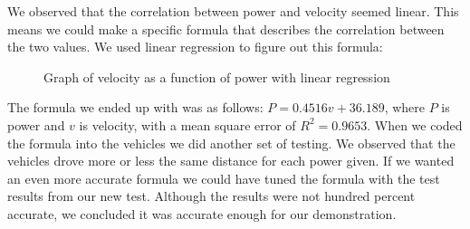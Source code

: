 We observed that the correlation between power and velocity seemed linear. This means we could make a specific formula that describes the correlation between the two values. We used linear regression to figure out this formula:

\begin{figure}[h!]
	\caption{Graph of velocity as a function of power with linear regression}
\end{figure}

The formula we ended up with was as follows: $P = 0.4516v + 36.189$, where $P$ is power and $v$ is velocity, with a mean square error of $R^2=0.9653$. When we coded the formula into the vehicles we did another set of testing. We observed that the vehicles drove more or less the same distance for each power given. If we wanted an even more accurate formula we could have tuned the formula with the test results from our new test. Although the results were not hundred percent accurate, we concluded it was accurate enough for our demonstration. 


